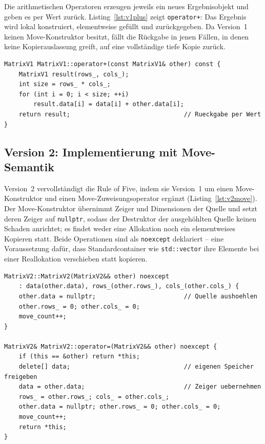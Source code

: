 \documentclass[10pt,a4paper]{article}
\begin{document}
Die arithmetischen Operatoren erzeugen jeweils ein neues Ergebnisobjekt und
geben es per Wert zurück. Listing~\ref{lst:v1plus} zeigt \texttt{operator+}: Das
Ergebnis wird lokal konstruiert, elementweise gefüllt und zurückgegeben. Da
Version~1 keinen Move-Konstruktor besitzt, fällt die Rückgabe in jenen Fällen,
in denen keine Kopierauslassung greift, auf eine vollständige tiefe Kopie
zurück.

\begin{lstlisting}[caption={Naive Implementierung von operator+ (V1)}, label={lst:v1plus}]
MatrixV1 MatrixV1::operator+(const MatrixV1& other) const {
    MatrixV1 result(rows_, cols_);
    int size = rows_ * cols_;
    for (int i = 0; i < size; ++i)
        result.data[i] = data[i] + other.data[i];
    return result;                               // Rueckgabe per Wert
}
\end{lstlisting}

\subsection{Version 2: Implementierung mit Move-Semantik}
\label{sec:v2}

Version~2 vervollständigt die Rule of Five, indem sie Version~1 um einen
Move-Konstruktor und einen Move-Zuweisungsoperator ergänzt
(Listing~\ref{lst:v2move}). Der Move-Konstruktor übernimmt Zeiger und
Dimensionen der Quelle und setzt deren Zeiger auf \texttt{nullptr}, sodass der
Destruktor der ausgehöhlten Quelle keinen Schaden anrichtet; es findet weder
eine Allokation noch ein elementweises Kopieren statt. Beide Operationen sind
als \texttt{noexcept} deklariert -- eine Voraussetzung dafür, dass
Standardcontainer wie \texttt{std::vector} ihre Elemente bei einer Reallokation
verschieben statt kopieren.

\begin{lstlisting}[caption={Move-Konstruktor und Move-Zuweisung (V2): Zeigeruebernahme in O(1)}, label={lst:v2move}]
MatrixV2::MatrixV2(MatrixV2&& other) noexcept
    : data(other.data), rows_(other.rows_), cols_(other.cols_) {
    other.data = nullptr;                        // Quelle aushoehlen
    other.rows_ = 0; other.cols_ = 0;
    move_count++;
}

MatrixV2& MatrixV2::operator=(MatrixV2&& other) noexcept {
    if (this == &other) return *this;
    delete[] data;                               // eigenen Speicher freigeben
    data = other.data;                           // Zeiger uebernehmen
    rows_ = other.rows_; cols_ = other.cols_;
    other.data = nullptr; other.rows_ = 0; other.cols_ = 0;
    move_count++;
    return *this;
}
\end{lstlisting}
\end{document}
